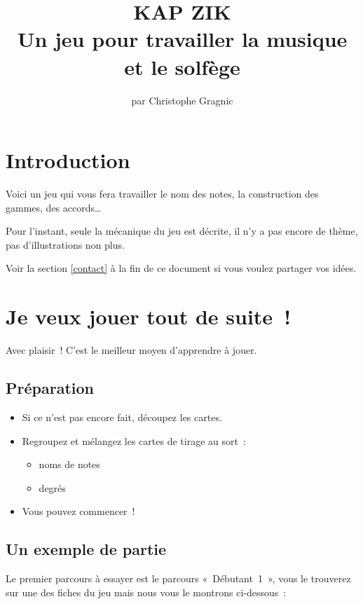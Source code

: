 \documentclass[11pt]{article}
\title{\vspace{-5em}
KAP ZIK \\
\vspace{1em}
Un jeu pour travailler la musique et le solfège}
\author{par Christophe Gragnic}
\date{}
\begin{document}
\maketitle

\setcounter{tocdepth}{2}
\tableofcontents

\section{Introduction}

Voici un jeu qui vous fera travailler le nom des notes, la construction des
gammes, des accords…

Pour l’instant, seule la mécanique du jeu est décrite, il n’y a pas encore de
thème, pas d’illustrations non plus.

Voir la section \ref{contact} à la fin de ce document si vous voulez partager
vos idées.

\newpage

\section{Je veux jouer tout de suite !}

Avec plaisir ! C’est le meilleur moyen d’apprendre à jouer.

\subsection{Préparation}

\begin{itemize}
\item Si ce n’est pas encore fait, découpez les cartes.
\item Regroupez et mélangez les cartes de tirage au sort :
    \begin{itemize}
    \item noms de notes
    \item degrés
    \end{itemize}
\item Vous pouvez commencer !
\end{itemize}

\subsection{Un exemple de partie}

Le premier parcours à essayer est le parcours « Débutant 1 », vous le trouverez
sur une des fiches du jeu mais nous vous le montrons ci-dessous :
\end{document}
